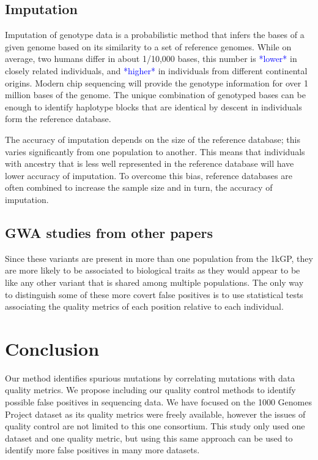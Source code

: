 \documentclass[9pt,lineno]{elife}
\newcommand{\luke}[1]{\textcolor{blue}{Luke: #1}}
\newcommand{\todo}[1]{\textcolor{blue}{*#1*}}
\begin{document}

\subsection{Imputation}
Imputation of genotype data is a probabilistic method that infers the bases of a given genome based on its similarity to a set of reference genomes.
While on average, two humans differ in about 1/10,000 bases, this number is \todo{lower} in closely related individuals, and \todo{higher} in individuals from different continental origins.
Modern chip sequencing will provide the genotype information for over 1 million bases of the genome.
The unique combination of genotyped bases can be enough to identify haplotype blocks that are identical by descent in individuals form the reference database.

The accuracy of imputation depends on the size of the reference database; this varies significantly from one population to another.
This means that individuals with ancestry that is less well represented in the reference database will have lower accuracy of imputation.
To overcome this bias, reference databases are often combined to increase the sample size and in turn, the accuracy of imputation.

\subsection{GWA studies from other papers}
Since these variants are present in more than one population from the 1kGP, they are more likely to be associated to biological traits as they would appear to be like any other variant that is shared among multiple populations. 
The only way to distinguish some of these more covert false positives is to use statistical tests associating the quality metrics of each position relative to each individual. 


			\section{Conclusion}
Our method identifies spurious mutations by correlating mutations with data quality metrics. 
We propose including our quality control methods to identify possible false positives in sequencing data. 
We have focused on the 1000 Genomes Project dataset as its quality metrics were freely available, however the issues of quality control are not limited to this one consortium. 
This study only used one dataset and one quality metric, but using this same approach can be used to identify more false positives in many more datasets. 
\end{document}
